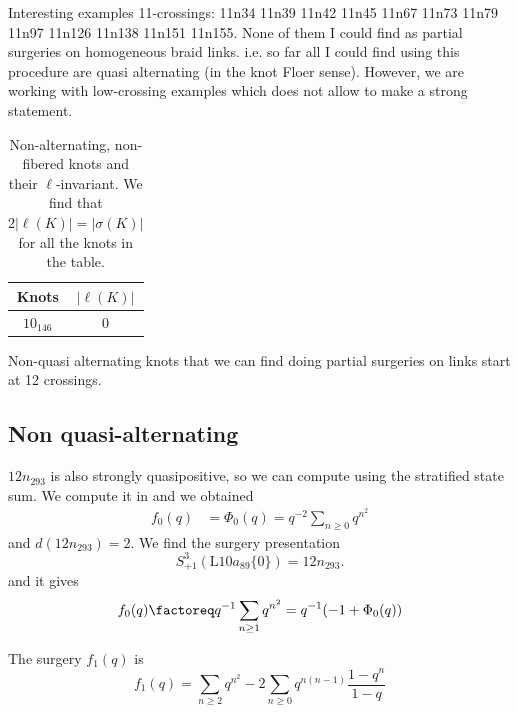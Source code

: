 \documentclass[11pt,e-only]{amsart}
\begin{document}
Interesting examples 11-crossings: 11n34 11n39 11n42 11n45 11n67 11n73 11n79 11n97 11n126 11n138 11n151 11n155. None of them I could find as partial surgeries on homogeneous braid links. i.e. so far all I could find using this procedure are quasi alternating (in the knot Floer sense). However, we are working with low-crossing examples which does not allow to make a strong statement.

\begin{table}[h!]
    \centering
    \begin{tabular}{|c|c|}
        \hline
        Knots & $|\ell(K)|$ \\
        \hline
        $10_{146}$ & 0 \\
        \hline
    \end{tabular}
    \caption{Non-alternating, non-fibered knots and their $\ell$-invariant. We find that $2|\ell(K)|=|\sigma(K)|$ for all the knots in the table.}
    \label{tab:L-invariant-nonalt}
\end{table}

Non-quasi alternating knots that we can find doing partial surgeries on links start at 12 crossings. 

\subsection{Non quasi-alternating}

\begin{example} $12n_{293}$ is also strongly quasipositive, so we can compute using the stratified state sum. We compute it in \cite{L-inv} and we obtained
\begin{equation}
\begin{split}
    f_0(q) &= \Phi_{0}(q)= q^{-2}\sum_{n\geq 0} q^{n^2}
\end{split}
\end{equation}
and $d(12n_{293})=2$. We find the surgery presentation 
\begin{equation}
    S^3_{+1}(\mathrm{L}10a_{89}\{0\})=12n_{293}.
\end{equation}
and it gives
\begin{equation}
    f_0(q) \factoreq q^{-1}\sum_{n\geq 1} q^{n^2} = q^{-1}(-1+\Phi_0(q))
\end{equation}
\end{example}
The surgery $f_1(q)$ is
\begin{equation}
    f_1(q)=\sum_{n\geq 2} q^{n^2} - 2\sum_{n\geq 0} q^{n(n-1)} \frac{1-q^n}{1-q}
\end{equation}
\end{document}
